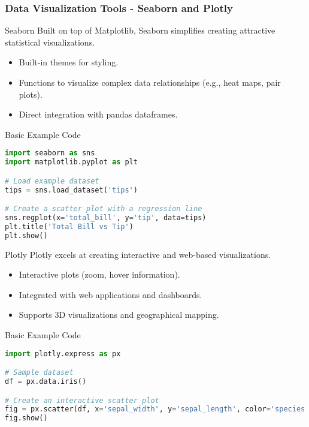 \documentclass[aspectratio=169]{beamer}
\begin{document}
\begin{frame}[fragile]
    \frametitle{Data Visualization Tools - Seaborn and Plotly}
    
    \begin{block}{Seaborn}
        Built on top of Matplotlib, Seaborn simplifies creating attractive statistical visualizations.
    \end{block}

    \begin{itemize}
        \item Built-in themes for styling.
        \item Functions to visualize complex data relationships (e.g., heat maps, pair plots).
        \item Direct integration with pandas dataframes.
    \end{itemize}
    
    \begin{block}{Basic Example Code}
        \begin{lstlisting}[language=Python]
import seaborn as sns
import matplotlib.pyplot as plt

# Load example dataset
tips = sns.load_dataset('tips')

# Create a scatter plot with a regression line
sns.regplot(x='total_bill', y='tip', data=tips)
plt.title('Total Bill vs Tip')
plt.show()
        \end{lstlisting}
    \end{block}
    
    \begin{block}{Plotly}
        Plotly excels at creating interactive and web-based visualizations.
    \end{block}

    \begin{itemize}
        \item Interactive plots (zoom, hover information).
        \item Integrated with web applications and dashboards.
        \item Supports 3D visualizations and geographical mapping.
    \end{itemize}

    \begin{block}{Basic Example Code}
        \begin{lstlisting}[language=Python]
import plotly.express as px

# Sample dataset
df = px.data.iris()

# Create an interactive scatter plot
fig = px.scatter(df, x='sepal_width', y='sepal_length', color='species', title='Iris Sepal Dimensions')
fig.show()
        \end{lstlisting}
    \end{block}
\end{frame}
\end{document}
